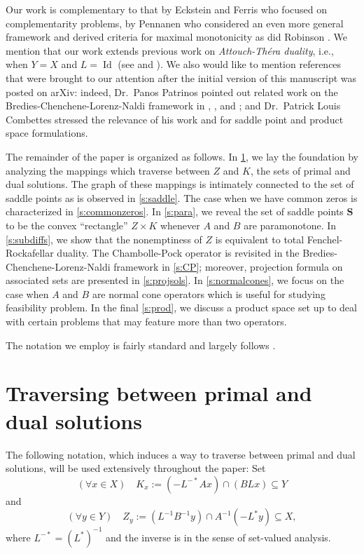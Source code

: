 \documentclass{article}
\newcommand{\Id}{\ensuremath{\operatorname{Id}}}
\newcommand{\bKT}{\ensuremath{{\mathbf{S}}}}
\begin{document}
Our work is complementary to that by 
Eckstein and Ferris \cite{EF} who focused on complementarity problems, 
by Pennanen \cite{Pennanen} who considered an even more general framework and derived criteria for maximal  monotonicity as did  Robinson \cite{Robinson}. 
We mention that our work extends previous work on 
\emph{Attouch-Th\'era duality}, 
i.e., when $Y=X$ and $L=\Id$  (see \cite{AT} and \cite{BBHM}). 
{
We also would like to mention 
references that were brought to our attention after 
the initial version of this manuscript 
was posted on arXiv: indeed,  
Dr.~Panos Patrinos pointed out related work 
on the Bredies-Chenchene-Lorenz-Naldi framework in 
\cite{LP}, \cite{EPLP}, and \cite{ELP};
and 
Dr.~Patrick Louis Combettes stressed the relevance 
of his work \cite{BAC} and \cite{theusual} for 
saddle point and product space formulations. 
}

The remainder of the paper is organized as follows.
In \cref{s:traverse}, we lay the foundation by analyzing the mappings 
which traverse between $Z$ and $K$, the sets of primal and dual solutions. 
The graph of these mappings is intimately connected to the set of saddle points as is observed in \cref{s:saddle}. 
The case when we have common zeros is characterized in 
\cref{s:commonzeros}. 
In \cref{s:para}, we reveal the set of saddle 
points $\bKT$ to be  
the convex ``rectangle'' $Z\times K$ 
whenever $A$ and $B$ are paramonotone. 
In \cref{s:subdiffs}, we show that the nonemptiness of $Z$ is 
equivalent to total Fenchel-Rockafellar duality. 
The Chambolle-Pock operator is revisited in 
the Bredies-Chenchene-Lorenz-Naldi framework in \cref{s:CP};
moreover, projection formula on associated sets are presented in 
\cref{s:projsols}. 
In \cref{s:normalcones}, we focus on the case when $A$ and $B$ are
normal cone operators which is useful for studying feasibility problem.
In the final \cref{s:prod}, we discuss a product space set up 
to deal with certain problems that may feature more than two operators. 

The notation we employ is fairly standard and largely follows 
\cite{BC2017}.



\section{Traversing between primal and dual solutions}

\label{s:traverse}

The following notation, which induces a way to traverse between 
primal and dual solutions, will be used extensively throughout the paper: 
Set 
\begin{equation}\label{eq:Kx}
(\forall x\in X)\quad 
K_x:=(-L^{-*}Ax)\cap (BLx)\subseteq Y
\end{equation}
and
\begin{equation}\label{eq:Zy}
(\forall y\in Y)\quad 
Z_y:=(L^{-1}B^{-1}y)\cap A^{-1}(-L^*y) \subseteq X, 
\end{equation}
{
where $L^{-*} = (L^{*})^{-1}$ and the inverse is 
in the sense of set-valued analysis.
}
\end{document}
